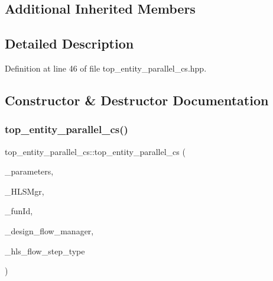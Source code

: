 \subsection*{Additional Inherited Members}


\subsection{Detailed Description}


Definition at line 46 of file top\+\_\+entity\+\_\+parallel\+\_\+cs.\+hpp.



\subsection{Constructor \& Destructor Documentation}
\mbox{\label{classtop__entity__parallel__cs_af70a7968013d5ef557934176aab944cb}} 
\subsubsection{\texorpdfstring{top\+\_\+entity\+\_\+parallel\+\_\+cs()}{top\_entity\_parallel\_cs()}}
{\footnotesize\ttfamily top\+\_\+entity\+\_\+parallel\+\_\+cs\+::top\+\_\+entity\+\_\+parallel\+\_\+cs (\begin{DoxyParamCaption}\item[{const \hyperlink{Parameter_8hpp_a37841774a6fcb479b597fdf8955eb4ea}{Parameter\+Const\+Ref}}]{\+\_\+parameters,  }\item[{const \hyperlink{hls__manager_8hpp_acd3842b8589fe52c08fc0b2fcc813bfe}{H\+L\+S\+\_\+manager\+Ref}}]{\+\_\+\+H\+L\+S\+Mgr,  }\item[{unsigned int}]{\+\_\+fun\+Id,  }\item[{const Design\+Flow\+Manager\+Const\+Ref}]{\+\_\+design\+\_\+flow\+\_\+manager,  }\item[{const \hyperlink{hls__step_8hpp_ada16bc22905016180e26fc7e39537f8d}{H\+L\+S\+Flow\+Step\+\_\+\+Type}}]{\+\_\+hls\+\_\+flow\+\_\+step\+\_\+type }\end{DoxyParamCaption})}



